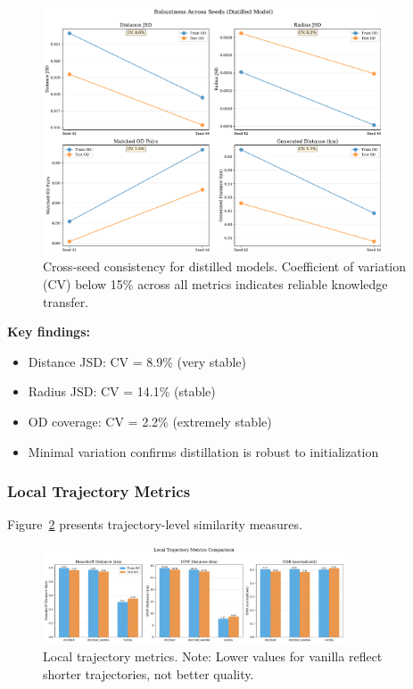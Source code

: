 \begin{figure}[h]
\centering
\includegraphics[width=0.9\textwidth]{assets/plots/hoser/seed_robustness.pdf}
\caption{Cross-seed consistency for distilled models. Coefficient of variation (CV) below 15\% across all metrics indicates reliable knowledge transfer.}
\label{fig:seed-robustness}
\end{figure}

\textbf{Key findings:}
\begin{itemize}[noitemsep,topsep=0pt]
\item Distance JSD: CV = 8.9\% (very stable)
\item Radius JSD: CV = 14.1\% (stable)
\item OD coverage: CV = 2.2\% (extremely stable)
\item Minimal variation confirms distillation is robust to initialization
\end{itemize}

\subsubsection{Local Trajectory Metrics}

Figure~\ref{fig:local-metrics} presents trajectory-level similarity measures.

\begin{figure}[h]
\centering
\includegraphics[width=0.8\textwidth]{assets/plots/hoser/local_metrics.pdf}
\caption{Local trajectory metrics. Note: Lower values for vanilla reflect shorter trajectories, not better quality.}
\label{fig:local-metrics}
\end{figure}

